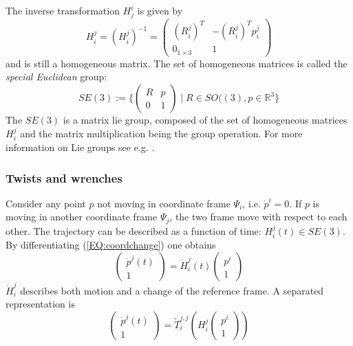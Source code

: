 \documentclass[a4paper,twoside, openright,12pt]{report}
\begin{document}
The inverse transformation $ H_j^i $ is given by 
\[H_i^j = (H_i^j)^{-1} = \begin{pmatrix}(R_i^j)^T & -(R_i^j)^T p_i^j \\ 0_{1 \times 3} & 1\end{pmatrix} \]
and is still a homogeneous matrix.
The set of homogeneous matrices is called the \emph{special Euclidean} group:
\begin{equation}
	SE(3) := \{\begin{pmatrix}R & p\\0 & 1\end{pmatrix} \; | \; R \in SO((3), p \in \mathbb{R}^3\} 
\end{equation}
The $SE(3)$ is a matrix lie group, composed of the set of homogeneous matrices $H_i^j$ and the matrix multiplication being the group operation. For more information on Lie groups see e.g. \cite{Stramigioli_01}.
\subsubsection{Twists and wrenches}
Consider any point $ p $ not moving in coordinate frame $\Psi_i $, i.e. $ \dot{p}^i = 0 $. If $ p $ is moving in another coordinate frame $ \Psi_j $, the two frame move with respect to each other. The trajectory can be described as a function of time: $H_i^j(t) \in SE(3)$. By differentiating (\ref{EQ:coordchange}) one obtains
\[\begin{pmatrix}\dot{p}^j(t) \\ 1\end{pmatrix} = \dot{H}_i^j(t) \begin{pmatrix}p^i \\ 1\end{pmatrix} \]
$ \dot{H}_i^j $ describes both motion and a change of the reference frame. A separated representation is
\begin{equation}\label{EQ:twistrighttranslation}
	\begin{pmatrix}\dot{p}^j(t) \\ 1\end{pmatrix} = \tilde{T}_i^{j,j}\left(H_i^{j}\begin{pmatrix}p^i \\ 1\end{pmatrix}\right)
\end{equation}
\end{document}

